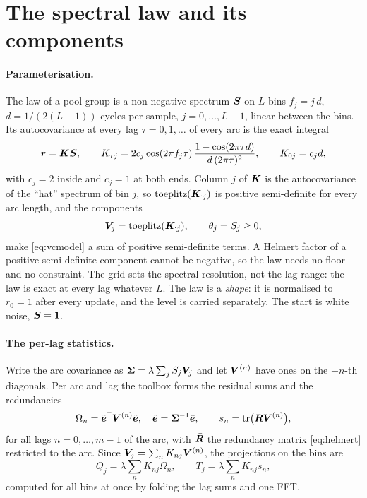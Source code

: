 \section{The spectral law and its components}\label{sec:hat}

\paragraph{Parameterisation.} The law of a pool group is a non-negative spectrum $\bm{S}$ on $L$
bins $f_j=j\,d$, $d=1/(2(L-1))$ cycles per sample, $j=0,\dots,L-1$, linear between the bins. Its
autocovariance at every lag $\tau=0,1,\dots$ of every arc is the exact integral
\begin{equation}\label{eq:hatacv}
\bm{r}=\bm{K}\bm{S},\qquad
K_{\tau j}=2c_j\cos(2\pi f_j\tau)\,\frac{1-\cos(2\pi\tau d)}{d\,(2\pi\tau)^2},\qquad K_{0j}=c_jd,
\end{equation}
with $c_j=2$ inside and $c_j=1$ at both ends. Column $j$ of $\bm{K}$ is the autocovariance of the
``hat'' spectrum of bin $j$, so $\operatorname{toeplitz}(\bm{K}_{:j})$ is positive semi-definite for
every arc length, and the components
\begin{equation}
\bm{V}_j=\operatorname{toeplitz}(\bm{K}_{:j}),\qquad \theta_j=S_j\ge0,
\end{equation}
make \eqref{eq:vcmodel} a sum of positive semi-definite terms. A Helmert factor of a positive
semi-definite component cannot be negative, so the law needs no floor and no constraint. The
grid sets the spectral resolution, not the lag range: the law is exact at every lag whatever $L$.
The law is a \emph{shape}: it is normalised to $r_0=1$ after every update, and the level is
carried separately. The start is white noise, $\bm{S}=\bm{1}$.

\paragraph{The per-lag statistics.} Write the arc covariance as
$\bm{\Sigma}=\lambda\sum_j S_j\bm{V}_j$ and let $\bm{V}^{(n)}$ have ones on the $\pm n$-th diagonals.
Per arc and lag the toolbox forms the residual sums and the redundancies
\begin{equation}\label{eq:lagstats}
\Omega_n=\tilde{\bm{e}}^{\mathsf T}\bm{V}^{(n)}\tilde{\bm{e}},\quad\tilde{\bm{e}}=\bm{\Sigma}^{-1}\hat{\bm{e}},\qquad
s_n=\operatorname{tr}\bigl(\bar{\bm{R}}\bm{V}^{(n)}\bigr),
\end{equation}
for all lags $n=0,\dots,m-1$ of the arc, with $\bar{\bm{R}}$ the redundancy matrix \eqref{eq:helmert}
restricted to the arc. Since $\bm{V}_j=\sum_n K_{nj}\bm{V}^{(n)}$, the projections on the bins are
\begin{equation}\label{eq:binstats}
Q_j=\lambda\sum_nK_{nj}\Omega_n,\qquad T_j=\lambda\sum_nK_{nj}s_n ,
\end{equation}
computed for all bins at once by folding the lag sums and one FFT.

